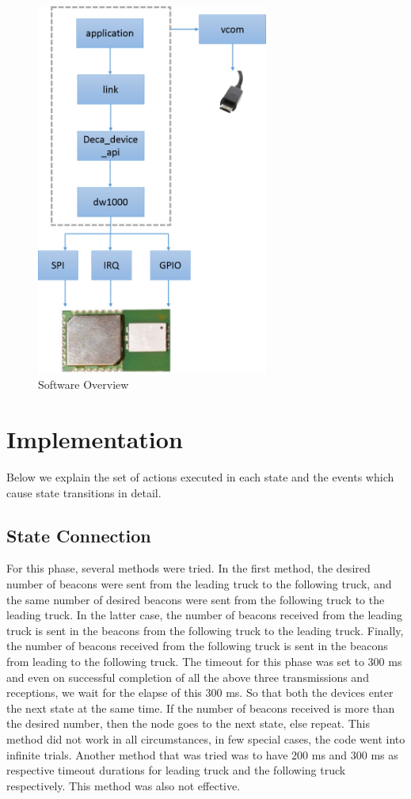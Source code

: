 \begin{figure}[h!]
    \includegraphics[width=3in]{figures/SoftwareOverview}
    \centering
    \caption{Software Overview}
    \label{fig:softwareOverview}    
\end{figure}

\section{Implementation}
Below we explain the set of actions executed in each state and the events which cause state transitions in detail.

\subsection{State Connection}
For this phase, several methods were tried. In the first method, the desired number of beacons were sent from the leading truck to the following truck, and the same number of desired beacons were sent from the following truck to the leading truck. In the latter case, the number of beacons received from the leading truck is sent in the beacons from the following truck to the leading truck. Finally, the number of beacons received from the following truck is sent in the beacons from leading to the following truck. The timeout for this phase was set to 300 ms and even on successful completion of all the above three transmissions and receptions, we wait for the elapse of this 300 ms. So that both the devices enter the next state at the same time. If the number of beacons received is more than the desired number, then the node goes to the next state, else repeat. This method did not work in all circumstances, in few special cases, the code went into infinite trials. Another method that was tried was to have 200 ms and 300 ms as respective timeout durations for leading truck and the following truck respectively. This method was also not effective.

